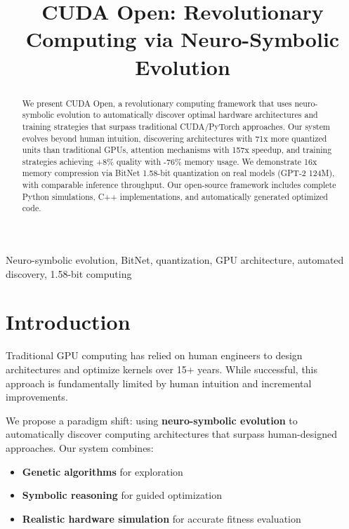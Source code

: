 \documentclass[10pt,conference]{IEEEtran}
\begin{document}
\title{CUDA Open: Revolutionary Computing via Neuro-Symbolic Evolution}

\author{
}

\maketitle

\begin{abstract}
We present CUDA Open, a revolutionary computing framework that uses neuro-symbolic evolution to automatically discover optimal hardware architectures and training strategies that surpass traditional CUDA/PyTorch approaches. Our system evolves beyond human intuition, discovering architectures with 71x more quantized units than traditional GPUs, attention mechanisms with 157x speedup, and training strategies achieving +8\% quality with -76\% memory usage. We demonstrate 16x memory compression via BitNet 1.58-bit quantization on real models (GPT-2 124M), with comparable inference throughput. Our open-source framework includes complete Python simulations, C++ implementations, and automatically generated optimized code.
\end{abstract}

\begin{IEEEkeywords}
Neuro-symbolic evolution, BitNet, quantization, GPU architecture, automated discovery, 1.58-bit computing
\end{IEEEkeywords}

\section{Introduction}

Traditional GPU computing has relied on human engineers to design architectures and optimize kernels over 15+ years. While successful, this approach is fundamentally limited by human intuition and incremental improvements.

We propose a paradigm shift: using \textbf{neuro-symbolic evolution} to automatically discover computing architectures that surpass human-designed approaches. Our system combines:
\begin{itemize}
    \item \textbf{Genetic algorithms} for exploration
    \item \textbf{Symbolic reasoning} for guided optimization
    \item \textbf{Realistic hardware simulation} for accurate fitness evaluation
\end{itemize}
\end{document}
